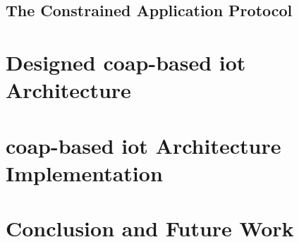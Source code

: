 \documentclass[conference]{IEEEtran}
\begin{document}
\subsection{The Constrained Application Protocol}


\section{Designed \gls{coap}-based \gls{iot} Architecture}



\section{\gls{coap}-based \gls{iot} Architecture Implementation}


\section{Conclusion and Future Work}





\printbibliography
\end{document}
